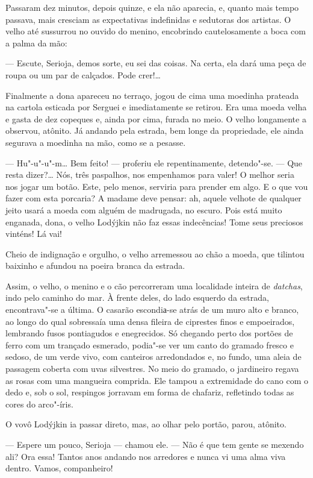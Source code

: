 Passaram dez minutos, depois quinze, e ela não aparecia, e, quanto mais
tempo passava, mais cresciam as expectativas indefinidas e sedutoras dos
artistas. O velho até sussurrou no ouvido do menino, encobrindo
cautelosamente a boca com a palma da mão:

--- Escute, Serioja, demos sorte, eu sei das coisas. Na certa, ela dará
uma peça de roupa ou um par de calçados. Pode crer!\ldots{}

Finalmente a dona apareceu no terraço, jogou de cima uma moedinha
prateada na cartola esticada por Serguei e imediatamente se retirou. Era
uma moeda velha e gasta de dez copeques e, ainda por cima, furada no
meio. O velho longamente a observou, atônito. Já andando pela estrada,
bem longe da propriedade, ele ainda segurava a moedinha na mão, como se
a pesasse.

--- Hu"-u"-u"-m\ldots{} Bem feito! --- proferiu ele repentinamente, detendo"-se.
--- Que resta dizer?\ldots{} Nós, três paspalhos, nos empenhamos para valer!
O melhor seria nos jogar um botão. Este, pelo menos, serviria para
prender em algo. E o que vou fazer com esta porcaria? A madame deve
pensar: ah, aquele velhote de qualquer jeito usará a moeda com alguém de
madrugada, no escuro. Pois está muito enganada, dona, o velho Lodýjkin
não faz essas indecências! Tome seus preciosos vinténs! Lá vai!

Cheio de indignação e orgulho, o velho arremessou ao chão a moeda, que
tilintou baixinho e afundou na poeira branca da estrada.

Assim, o velho, o menino e o cão percorreram uma localidade inteira de
\emph{datchas}, indo pelo caminho do mar. À frente deles, do lado
esquerdo da estrada, encontrava"-se a última. O casarão escondiа-se atrás
de um muro alto e branco, ao longo do qual sobressaía uma densa fileira
de ciprestes finos e empoeirados, lembrando fusos pontiagudos e
enegrecidos. Só chegando perto dos portões de ferro com um trançado
esmerado, podia"-se ver um canto do gramado fresco e sedoso, de um verde
vivo, com canteiros arredondados e, no fundo, uma aleia de passagem
coberta com uvas silvestres. No meio do gramado, o jardineiro regava as
rosas com uma mangueira comprida. Ele tampou a extremidade do cano com o
dedo e, sob o sol, respingos jorravam em forma de chafariz, refletindo
todas as cores do arco"-íris.

O vovô Lodýjkin ia passar direto, mas, ao olhar pelo portão, parou,
atônito.

--- Espere um pouco, Serioja --- chamou ele. --- Não é que tem gente se
mexendo ali? Ora essa! Tantos anos andando nos arredores e nunca vi uma
alma viva dentro. Vamos, companheiro!

